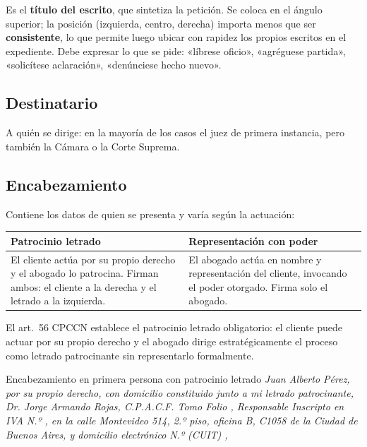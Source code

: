 \documentclass[12pt,oneside]{book}
\renewcommand{\arraystretch}{1.15}
\newcommand{\blanco}[1][1cm]{\underline{\hspace{#1}}}
\begin{document}
Es el \textbf{título del escrito}, que sintetiza la petición. Se coloca en el ángulo superior; la posición (izquierda, centro, derecha) importa menos que ser \textbf{consistente}, lo que permite luego ubicar con rapidez los propios escritos en el expediente. Debe expresar lo que se pide: «líbrese oficio», «agréguese partida», «solicítese aclaración», «denúnciese hecho nuevo».

\subsection{Destinatario}

A quién se dirige: en la mayoría de los casos el juez de primera instancia, pero también la Cámara o la Corte Suprema.

\subsection{Encabezamiento}

Contiene los datos de quien se presenta y varía según la actuación:

\begin{table}[H]
\centering
\renewcommand{\arraystretch}{1.25}
\begin{tabularx}{\textwidth}{>{\RaggedRight\arraybackslash}X>{\RaggedRight\arraybackslash}X}
\toprule
\textbf{Patrocinio letrado} & \textbf{Representación con poder} \\
\midrule
El cliente actúa por su propio derecho y el abogado lo patrocina. Firman ambos: el cliente a la derecha y el letrado a la izquierda. & El abogado actúa en nombre y representación del cliente, invocando el poder otorgado. Firma solo el abogado. \\
\bottomrule
\end{tabularx}
\end{table}

El art.~56 CPCCN establece el patrocinio letrado obligatorio: el cliente puede actuar por su propio derecho y el abogado dirige estratégicamente el proceso como letrado patrocinante sin representarlo formalmente.

\begin{example}{Encabezamiento en primera persona con patrocinio letrado}
\textit{Juan Alberto Pérez, por su propio derecho, con domicilio constituido junto a mi letrado patrocinante, Dr. Jorge Armando Rojas, C.P.A.C.F. Tomo \blanco[0.8cm] Folio \blanco[0.8cm], Responsable Inscripto en IVA N.º \blanco[1.5cm], en la calle Montevideo 514, 2.º piso, oficina B, C1058 de la Ciudad de Buenos Aires, y domicilio electrónico N.º (CUIT) \blanco[2.5cm],}
\end{example}
\end{document}
